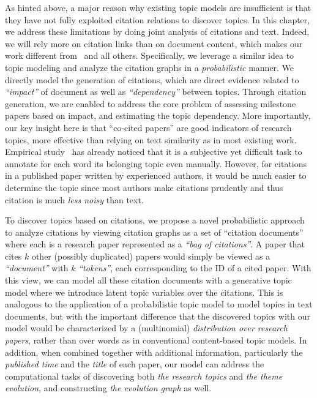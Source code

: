 As hinted above, a major reason why existing topic models are insufficient is
that they have not fully exploited citation relations to discover topics. In
this chapter, we address these limitations by doing joint analysis of citations
and text.  Indeed, we will rely  more on citation links than on document
content, which makes our work different from~\cite{nallapati2008joint} and all
others. Specifically, we leverage a similar idea to topic modeling and analyze
the citation graphs in a \emph{probabilistic} manner. We directly model the
generation of citations, which are direct evidence related to \emph{``impact''}
of document as well as \emph{``dependency''} between topics. Through citation
generation, we are enabled to address the core problem of assessing milestone
papers based on impact, and estimating the topic dependency.  More importantly,
our key insight here is that ``co-cited papers'' are good indicators of research
topics, more effective than relying on text similarity as in most existing work.
Empirical study~\cite{boyd2009reading} has already noticed that it is a
subjective yet difficult task to annotate for each word its belonging topic even
manually. However, for citations in a published paper written by experienced
authors, it would be much easier to determine the topic since most authors make
citations prudently and thus citation is much \emph{less noisy} than text.

To discover topics based on citations, we propose a novel probabilistic approach
to analyze citations by viewing citation graphs as a set of ``citation
documents'' where each is a research paper represented as a \emph{``bag of
citations''}. A paper that cites $k$ other (possibly duplicated) papers would
simply be viewed as a \emph{``document''} with $k$ \emph{``tokens''}, each
corresponding to the ID of a cited paper. With this view, we can model all these
citation documents with a generative topic model where we introduce latent topic
variables over the citations. This is analogous to the application of a
probabilistic topic model to model topics in text documents, but with the
important difference that the discovered topics with our model would be
characterized by a (multinomial) \emph{distribution over research papers},
rather than over words as in conventional content-based topic models. In
addition, when combined together with additional information, particularly the
\emph{published time} and the \emph{title} of each paper, our model can address
the computational tasks of discovering both \emph{the research topics} and
\emph{the theme evolution}, and constructing \emph{the evolution graph} as well.

